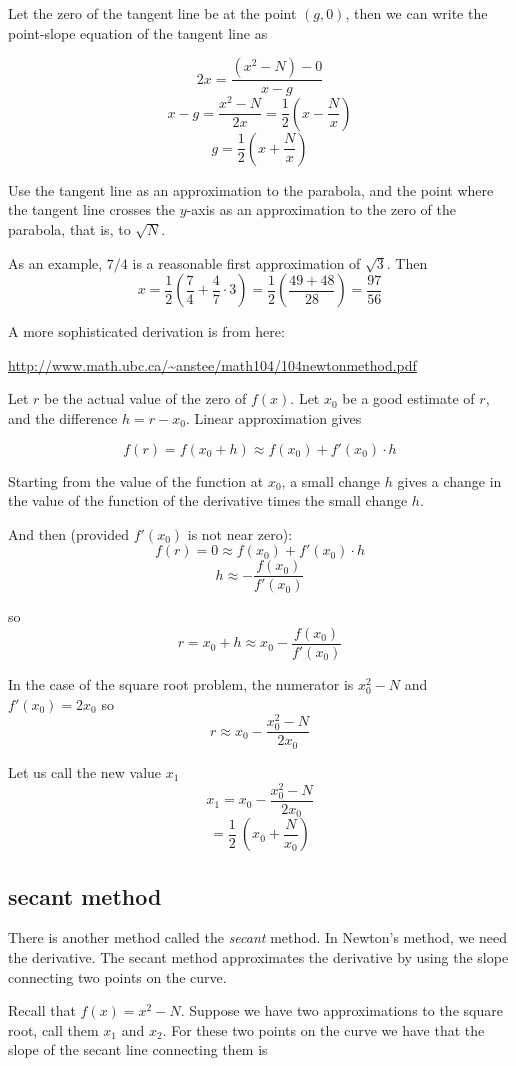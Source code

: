 \documentclass[11pt, oneside]{article}
\begin{document}
Let the zero of the tangent line be at the point $(g,0)$, then we can write the point-slope equation of the tangent line as

\[ 2x = \frac{(x^2 - N) - 0}{x - g} \]
\[ x - g = \frac{x^2 - N}{2x} = \frac{1}{2} (x - \frac{N}{x})  \]
\[ g = \frac{1}{2} (x + \frac{N}{x}) \]

Use the tangent line as an approximation to the parabola, and the point where the tangent line crosses the $y$-axis as an approximation to the zero of the parabola, that is, to $\sqrt{N}$.

As an example, $7/4$ is a reasonable first approximation of $\sqrt{3}$.  Then
\[ x = \frac{1}{2} (\frac{7}{4} + \frac{4}{7} \cdot 3) = \frac{1}{2} (\frac{49 + 48}{28})  = \frac{97}{56} \]

A more sophisticated derivation is from here:

\url{http://www.math.ubc.ca/~anstee/math104/104newtonmethod.pdf}

Let $r$ be the actual value of the zero of $f(x)$.  Let $x_0$ be a good estimate of $r$, and the difference $h = r - x_0$.  Linear approximation gives

\[ f(r) = f(x_0 + h) \approx f(x_0) + f'(x_0) \cdot h \]

Starting from the value of the function at $x_0$, a small change $h$ gives a change in the value of the function of the derivative times the small change $h$.

And then (provided $f'(x_0)$ is not near zero):
\[ f(r) = 0  \approx f(x_0) + f'(x_0) \cdot h \] 
\[ h \approx -\frac{f(x_0)}{f'(x_0)} \]

so
\[ r = x_0 + h \approx x_0 -\frac{f(x_0)}{f'(x_0)} \]

In the case of the square root problem, the numerator is $ x_0^2 - N$ and $f'(x_0) = 2x_0$ so
\[ r \approx x_0 -\frac{x_0^2 - N}{2x_0} \]

Let us call the new value $x_1$
\[ x_1 = x_0 -\frac{x_0^2 - N}{2x_0} \]
\[ = \frac{1}{2} \ (x_0 + \frac{N}{x_0}) \]

\subsection*{secant method}

There is another method called the \emph{secant} method.  In Newton's method, we need the derivative.  The secant method approximates the derivative by using the slope connecting two points on the curve.

Recall that $f(x) = x^2 - N$.  Suppose we have two approximations to the square root, call them $x_1$ and $x_2$.  For these two points on the curve we have that the slope of the secant line connecting them is
\end{document}
